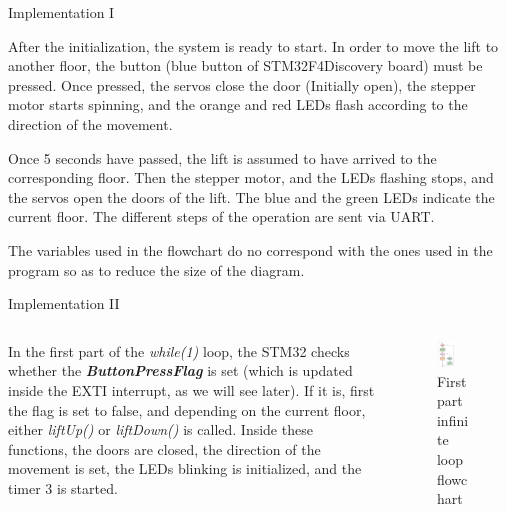 \documentclass[aspectratio=169]{beamer}
\begin{document}
\begin{frame}{Implementation I}

After the initialization, the system is ready to start. In order to move the lift to another floor, the button (blue button of STM32F4Discovery board) must be pressed. Once pressed, the servos close the door (Initially open), the stepper motor starts spinning, and the orange and red LEDs flash according to the direction of the movement.\medskip

Once 5 seconds have passed, the lift is assumed to have arrived to the corresponding floor. Then the stepper motor, and the LEDs flashing stops, and the servos open the doors of the lift. The blue and the green LEDs indicate the current floor. The different steps of the operation are sent via UART. \medskip

The variables used in the flowchart do no correspond with the ones used in the program so as to reduce the size of the diagram.

\end{frame}

\begin{frame}{Implementation II}
\begin{columns}
\begin{column}{0.5\textwidth}

   In the first part of the \textit{while(1)} loop, the STM32 checks whether the \textbf{\textit{ButtonPressFlag}} is set (which is updated inside the EXTI interrupt, as we will see later). If it is, first the flag is set to false, and depending on the current floor, either \textit{liftUp()} or \textit{liftDown()} is called. Inside these functions, the doors are closed, the direction of the movement is set, the LEDs blinking is initialized, and the timer 3 is started.
   
\end{column}
\begin{column}{0.5\textwidth} 
    \begin{figure}
    \centering
     \includegraphics[width=0.5\textwidth]{Graphics/AXGLYPH_PDF/while_1st.pdf}
     \caption{First part infinite loop flowchart}
     \label{fig:firstFlow}
     \end{figure}
\end{column}
\end{columns}
\end{frame}
\end{document}
